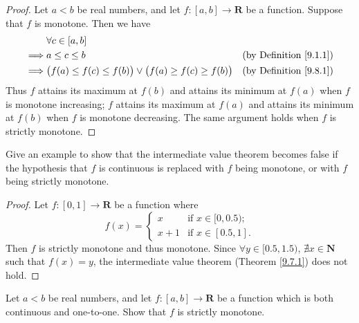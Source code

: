 \begin{proof}
    Let \(a < b\) be real numbers, and let \(f : [a, b] \to \mathbf{R}\) be a function.
    Suppose that \(f\) is monotone.
    Then we have
    \begin{align*}
                 & \forall c \in [a, b]                                                                                            \\
        \implies & a \leq c \leq b                                                            & \text{(by Definition \ref{9.1.1})} \\
        \implies & \big(f(a) \leq f(c) \leq f(b)\big) \lor \big(f(a) \geq f(c) \geq f(b)\big) & \text{(by Definition \ref{9.8.1})} \\
    \end{align*}
    Thus \(f\) attains its maximum at \(f(b)\) and attains its minimum at \(f(a)\) when \(f\) is monotone increasing;
    \(f\) attains its maximum at \(f(a)\) and attains its minimum at \(f(b)\) when \(f\) is monotone decreasing.
    The same argument holds when \(f\) is strictly monotone.
\end{proof}

\begin{exercise}\label{ex 9.8.2}
    Give an example to show that the intermediate value theorem becomes false if the hypothesis that \(f\) is continuous is replaced with \(f\) being monotone, or with \(f\) being strictly monotone.
\end{exercise}

\begin{proof}
    Let \(f : [0, 1] \to \mathbf{R}\) be a function where
    \[
        f(x) = \begin{cases}
            x     & \text{if } x \in [0, 0.5); \\
            x + 1 & \text{if } x \in [0.5, 1].
        \end{cases}
    \]
    Then \(f\) is strictly monotone and thus monotone.
    Since \(\forall y \in [0.5, 1.5)\), \(\nexists x \in \mathbf{N}\) such that \(f(x) = y\), the intermediate value theorem (Theorem \ref{9.7.1}) does not hold.
\end{proof}

\begin{exercise}\label{ex 9.8.3}
    Let \(a < b\) be real numbers, and let \(f : [a, b] \to \mathbf{R}\) be a function which is both continuous and one-to-one.
    Show that \(f\) is strictly monotone.
\end{exercise}

